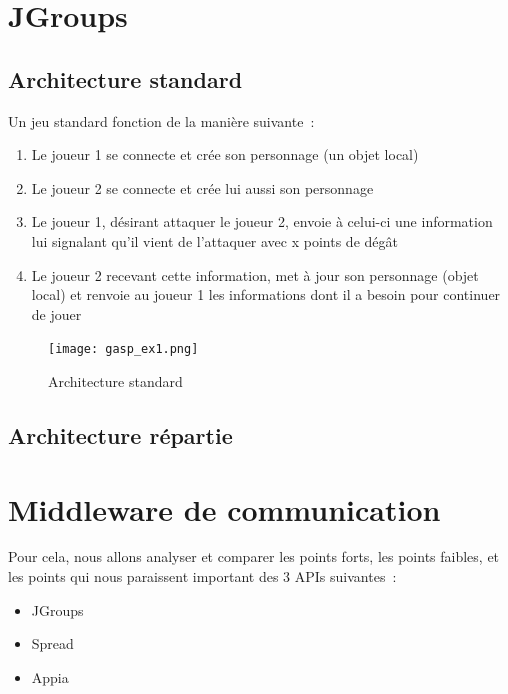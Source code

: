 \documentclass[a4paper,10pt]{report}
\begin{document}
\section{JGroups}
\subsection{}


\subsection{Architecture standard}

Un jeu standard fonction de la manière suivante~:
\begin{enumerate}
  \item Le joueur 1 se connecte et crée son personnage (un objet local)
  \item Le joueur 2 se connecte et crée lui aussi son personnage
  \item Le joueur 1, désirant attaquer le joueur 2, envoie à celui-ci une information lui signalant qu'il vient de l'attaquer avec x points de dégât
  \item Le joueur 2 recevant cette information, met à jour son personnage (objet local) et renvoie au joueur 1 les informations dont il a besoin pour continuer de jouer
\end{enumerate}

\begin{figure}[!hb]
  \begin{center}
    \texttt{[image: gasp\_ex1.png]}
  \end{center}
  \caption{\label{gasp_ex1}Architecture standard}
\end{figure}

\subsection{Architecture répartie}

\section{Middleware de communication}

Pour cela, nous allons analyser et comparer les points forts, les points faibles, et les points qui nous paraissent important des 3 APIs suivantes~:
\begin{itemize}
  \item JGroups~\cite{jgroup}
  \item Spread~\cite{spread}
  \item Appia~\cite{appia}
\end{itemize}
\end{document}
